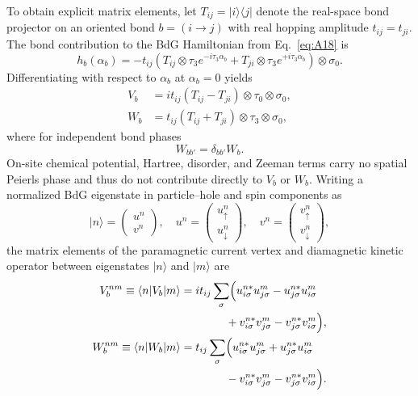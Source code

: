 \documentclass[aps,prb,twocolumn,superscriptaddress,floatfix]{revtex4-2}
\begin{document}
To obtain explicit matrix elements, let $T_{ij} = |i\rangle\langle j|$ denote the real-space bond projector on an oriented bond $b = (i \to j)$ with real hopping amplitude $t_{ij} = t_{ji}$. The bond contribution to the BdG Hamiltonian from Eq.~\eqref{eq:A18} is
\begin{equation}
h_b(\alpha_b) = -t_{ij}\left( T_{ij}\otimes \tau_3 e^{-i\tau_3 \alpha_b} + T_{ji}\otimes \tau_3 e^{+i\tau_3 \alpha_b} \right) \otimes \sigma_0.
\label{eq:A42}
\end{equation}
Differentiating with respect to $\alpha_b$ at $\alpha_b = 0$ yields
\begin{equation}
\begin{aligned}
V_b &= i t_{ij} (T_{ij} - T_{ji}) \otimes \tau_0 \otimes \sigma_0, \\
W_b &= t_{ij} (T_{ij} + T_{ji}) \otimes \tau_3 \otimes \sigma_0,
\end{aligned}
\label{eq:A43}
\end{equation}
where for independent bond phases
\begin{equation}
W_{bb'} = \delta_{bb'} W_b.
\label{eq:A44}
\end{equation}
On-site chemical potential, Hartree, disorder, and Zeeman terms carry no spatial Peierls phase and thus do not contribute directly to $V_b$ or $W_b$. Writing a normalized BdG eigenstate in particle--hole and spin components as
\begin{equation}
|n\rangle = \begin{pmatrix} u^n \\ v^n \end{pmatrix}, \quad u^n = \begin{pmatrix} u_\uparrow^n \\ u_\downarrow^n \end{pmatrix}, \quad v^n = \begin{pmatrix} v_\uparrow^n \\ v_\downarrow^n \end{pmatrix},
\label{eq:A45}
\end{equation}
the matrix elements of the paramagnetic current vertex and diamagnetic kinetic operator between eigenstates $|n\rangle$ and $|m\rangle$ are
\begin{align}
V_b^{nm} \equiv \langle n|V_b|m\rangle &= i t_{ij} \sum_\sigma \Bigl( u_{i\sigma}^{n*} u_{j\sigma}^m - u_{j\sigma}^{n*} u_{i\sigma}^m \nonumber \\
&\qquad\qquad + v_{i\sigma}^{n*} v_{j\sigma}^m - v_{j\sigma}^{n*} v_{i\sigma}^m \Bigr), \label{eq:A46} \\
W_b^{nm} \equiv \langle n|W_b|m\rangle &= t_{ij} \sum_\sigma \Bigl( u_{i\sigma}^{n*} u_{j\sigma}^m + u_{j\sigma}^{n*} u_{i\sigma}^m \nonumber \\
&\qquad\qquad - v_{i\sigma}^{n*} v_{j\sigma}^m - v_{j\sigma}^{n*} v_{i\sigma}^m \Bigr). \label{eq:A47}
\end{align}
\end{document}
